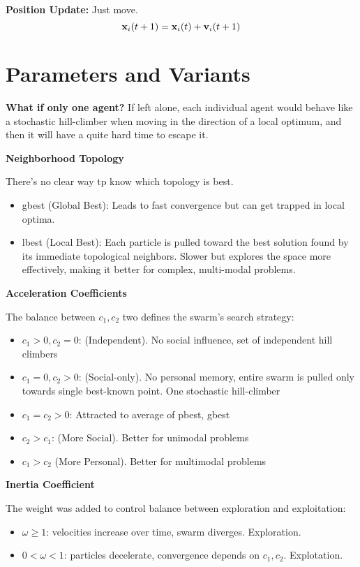 \textbf{Position Update:} 
Just move. 
\[
\mathbf{x}_i(t+1) = \mathbf{x}_i(t) + \mathbf{v}_i(t+1)
\]

\section*{Parameters and Variants}

\textbf{What if only one agent?}
If left alone, each individual agent would behave like a stochastic hill-climber when moving
in the direction of a local optimum, and then it will have a quite hard time to escape it.

\textbf{Neighborhood Topology} 

There's no clear way tp know which topology is best. 

\begin{itemize}
    \item gbest (Global Best): Leads to fast convergence but can get trapped in local optima.
    \item lbest (Local Best): Each particle is pulled toward the best solution found by its immediate topological neighbors. Slower but explores the space more effectively, making it better for complex, multi-modal problems.
\end{itemize}

\textbf{Acceleration Coefficients}

The balance between $c_1, c_2$ two defines the swarm's search strategy:

\begin{itemize}
    \item $c_1 > 0, c_2 = 0$: (Independent). No social influence, set of independent hill climbers 
    \item $c_1 = 0, c_2 > 0$: (Social-only). No personal memory, entire swarm is pulled 
    only towards single best-known point. One stochastic hill-climber 
    \item $c_1 = c_2 > 0$: Attracted to average of pbest, gbest 
    \item $c_2 > c_1$: (More Social). Better for unimodal problems
    \item $c_1 > c_2$ (More Personal). Better for multimodal problems
\end{itemize}

\textbf{Inertia Coefficient}

The weight was added to control balance between exploration and exploitation:

\begin{itemize}
    \item $\omega \ge 1$: velocities increase over time, swarm diverges. Exploration.
    \item $0 < \omega < 1$: particles decelerate, convergence depends on $c_1, c_2$. Explotation.
\end{itemize}

